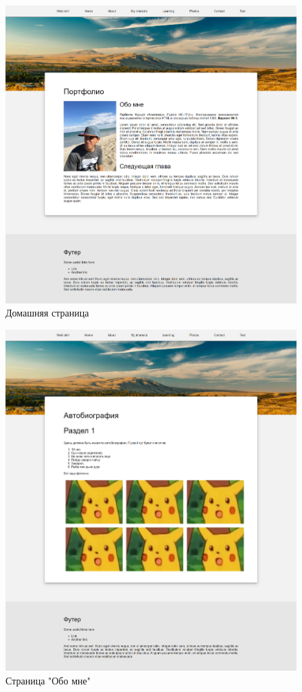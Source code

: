 \documentclass[a4paper,14pt]{extarticle}
\begin{document}
\begin{figure}[H]
    \centering
    \includegraphics[width=.8\linewidth]{../images/homepage}
    \caption{Домашняя страница}
    \label{fig:homepage}
\end{figure}
\begin{figure}[H]
    \centering
    \includegraphics[width=.8\linewidth]{../images/about}
    \caption{Страница "Обо мне"}
    \label{fig:about}
\end{figure}
\end{document}
